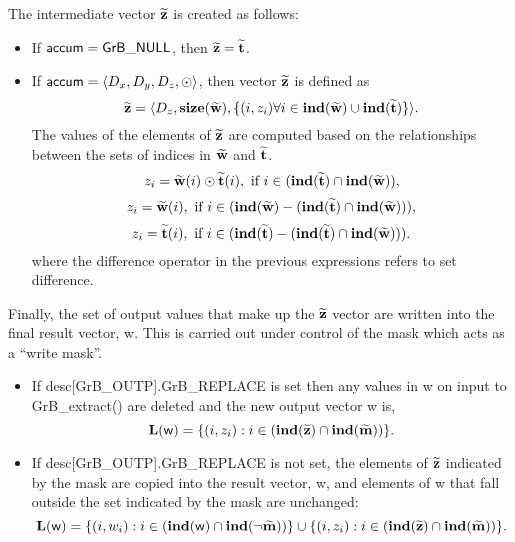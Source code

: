 The intermediate vector ${\bf \widetilde{z}}$ is created as follows:
\begin{itemize}
    \item If ${\sf accum} = {\sf GrB\_NULL}$, then 
    ${\bf \widetilde{z}} = {\bf \widetilde{t}}$.

    \item If ${\sf accum} = \langle D_x, D_y, D_z, \odot \rangle$, then vector 
    ${\bf \widetilde{z}}$ is defined as 
        \[ {\bf \widetilde{z}} = \langle D_z, \bold{size}({\bf \widetilde{w}}), 
		\{(i,z_{i})  \forall i \in \bold{ind}({\bf \widetilde{w}}) \cup 
        \bold{ind}({\bf \widetilde{t}}) \} \rangle.\]
    The values of the elements of ${\bf \widetilde{z}}$ are computed based on the relationships between the sets of indices in ${\bf \widetilde{w}}$ and ${\bf \widetilde{t}}$.
\[
z_{i} = {\bf \widetilde{w}}(i) \odot {\bf \widetilde{t}}(i), \ \mbox{if}\  i \in  (\bold{ind}({\bf \widetilde{t}}) \cap \bold{ind}({\bf \widetilde{w}})),
\]
\[
z_{i} = {\bf \widetilde{w}}(i), \ \mbox{if}\  i \in  (\bold{ind}({\bf \widetilde{w}}) - (\bold{ind}({\bf \widetilde{t}}) \cap \bold{ind}({\bf \widetilde{w}}))),
\]
\[
z_{i} = {\bf \widetilde{t}}(i), \ \mbox{if}\  i \in  (\bold{ind}({\bf \widetilde{t}}) - (\bold{ind}({\bf \widetilde{t}}) \cap \bold{ind}({\bf \widetilde{w}}))).
\]
where the difference operator in the previous expressions refers to set difference.
\end{itemize}

Finally, the set of output values that make up the ${\bf \widetilde{z}}$ 
vector are written into the final result vector, {\sf w}. 
This is carried out under control of the mask which acts as a ``write mask''.
\begin{itemize}
\item If {\sf desc[GrB\_OUTP].GrB\_REPLACE} is set then any values in {\sf w} 
on input to {\sf GrB\_extract()} are deleted and the new output vector {\sf w} is,
\[ \bold{L}({\sf w}) = \{(i,z_{i}) : i \in (\bold{ind}({\bf \widetilde{z}}) 
\cap \bold{ind}({\bf \widetilde{m}})) \}. \]

\item If {\sf desc[GrB\_OUTP].GrB\_REPLACE} is not set, the elements of 
${\bf \widetilde{z}}$ indicated by 
the mask are copied into the result vector, {\sf w}, and elements of 
{\sf w} that fall outside the set indicated by the mask are unchanged:
\[ \bold{L}({\sf w}) = \{(i,w_{i}) : i \in (\bold{ind}({\sf w}) 
\cap \bold{ind}(\neg {\bf \widetilde{m}})) \} \cup \{(i,z_{i}) : i \in 
(\bold{ind}({\bf \widetilde{z}}) \cap \bold{ind}({\bf \widetilde{m}})) \}. \]
\end{itemize}

